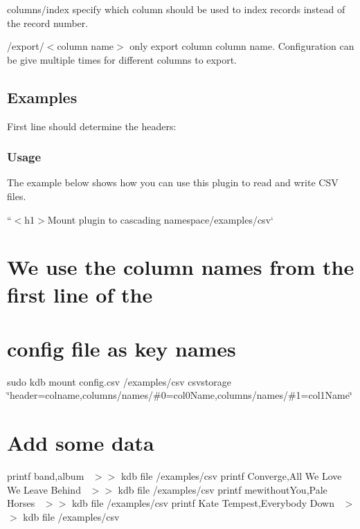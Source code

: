 {\ttfamily columns/index} specify which column should be used to index records instead of the record number.

{\ttfamily /export/$<$column name$>$} only export column {\ttfamily column name}. Configuration can be give multiple times for different columns to export.

\subsection*{Examples}

First line should determine the headers\+: 


\subsubsection*{Usage}

The example below shows how you can use this plugin to read and write C\+SV files.

``{\ttfamily  $<$h1$>$Mount plugin to cascading namespace}/examples/csv` \section*{We use the column names from the first line of the}

\section*{config file as key names}

sudo kdb mount config.\+csv /examples/csv csvstorage \char`\"{}header=colname,columns/names/\#0=col0\+Name,columns/names/\#1=col1\+Name\char`\"{}

\section*{Add some data}

printf \textquotesingle{}band,album~\newline
\textquotesingle{} $>$$>$ {\ttfamily kdb file /examples/csv} printf \textquotesingle{}Converge,All We Love We Leave Behind~\newline
\textquotesingle{} $>$$>$ {\ttfamily kdb file /examples/csv} printf \textquotesingle{}mewithout\+You,Pale Horses~\newline
\textquotesingle{} $>$$>$ {\ttfamily kdb file /examples/csv} printf \textquotesingle{}Kate Tempest,Everybody Down~\newline
\textquotesingle{} $>$$>$ {\ttfamily kdb file /examples/csv}

